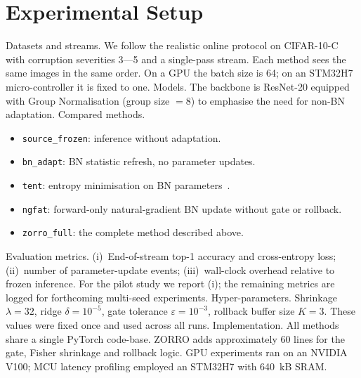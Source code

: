 \documentclass{article} %
\begin{document}
\section{Experimental Setup}
\label{sec:experimental}%
Datasets and streams. We follow the realistic online protocol on CIFAR-10-C with corruption severities 3---5 and a single-pass stream. Each method sees the same images in the same order. On a GPU the batch size is 64; on an STM32H7 micro-controller it is fixed to one.
Models. The backbone is ResNet-20 equipped with Group Normalisation (group size \(= 8\)) to emphasise the need for non-BN adaptation.
Compared methods.
\begin{itemize}
\item \texttt{source\_frozen}: inference without adaptation.
\item \texttt{bn\_adapt}: BN statistic refresh, no parameter updates.
\item \texttt{tent}: entropy minimisation on BN parameters~\cite{wang-2020-tent}.
\item \texttt{ngfat}: forward-only natural-gradient BN update without gate or rollback.
\item \texttt{zorro\_full}: the complete method described above.
\end{itemize}
Evaluation metrics. (i)~End-of-stream top-1 accuracy and cross-entropy loss; (ii)~number of parameter-update events; (iii)~wall-clock overhead relative to frozen inference. For the pilot study we report (i); the remaining metrics are logged for forthcoming multi-seed experiments.
Hyper-parameters. Shrinkage \(\lambda = 32\), ridge \(\delta = 10^{-5}\), gate tolerance \(\varepsilon = 10^{-3}\), rollback buffer size \(K = 3\). These values were fixed once and used across all runs.
Implementation. All methods share a single PyTorch code-base. ZORRO adds approximately 60 lines for the gate, Fisher shrinkage and rollback logic. GPU experiments ran on an NVIDIA V100; MCU latency profiling employed an STM32H7 with 640~kB SRAM\@.
\end{document}
